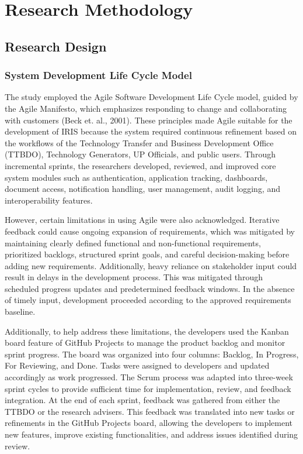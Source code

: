 
\chapter{Research Methodology}

\section{Research Design}

\subsection{System Development Life Cycle Model}
The study employed the Agile Software Development Life Cycle model, guided by the Agile Manifesto, which emphasizes responding to change and collaborating with customers (Beck et. al., 2001). These principles made Agile suitable for the development of IRIS because the system required continuous refinement based on the workflows of the Technology Transfer and Business Development Office (TTBDO), Technology Generators, UP Officials, and public users. Through incremental sprints, the researchers developed, reviewed, and improved core system modules such as authentication, application tracking, dashboards, document access, notification handling, user management, audit logging, and interoperability features.

However, certain limitations in using Agile were also acknowledged. Iterative feedback could cause ongoing expansion of requirements, which was mitigated by maintaining clearly defined functional and non-functional requirements, prioritized backlogs, structured sprint goals, and careful decision-making before adding new requirements. Additionally, heavy reliance on stakeholder input could result in delays in the development process. This was mitigated through scheduled progress updates and predetermined feedback windows. In the absence of timely input, development proceeded according to the approved requirements baseline.

Additionally, to help address these limitations, the developers used the Kanban board feature of GitHub Projects to manage the product backlog and monitor sprint progress. The board was organized into four columns: Backlog, In Progress, For Reviewing, and Done. Tasks were assigned to developers and updated accordingly as work progressed. The Scrum process was adapted into three-week sprint cycles to provide sufficient time for implementation, review, and feedback integration. At the end of each sprint, feedback was gathered from either the TTBDO or the research advisers. This feedback was translated into new tasks or refinements in the GitHub Projects board, allowing the developers to implement new features, improve existing functionalities, and address issues identified during review.

